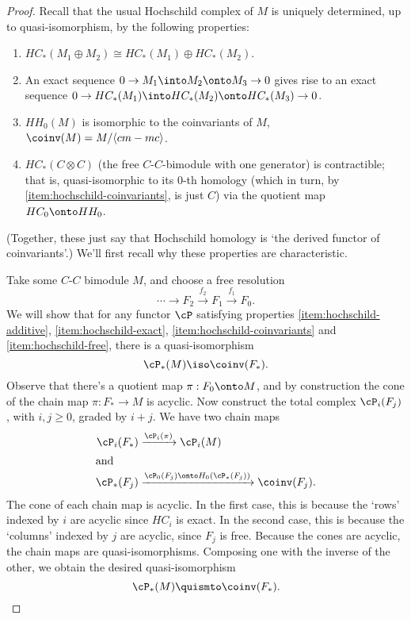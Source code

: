 \begin{proof}
Recall that the usual Hochschild complex of $M$ is uniquely determined,
up to quasi-isomorphism, by the following properties:
\begin{enumerate}
\item \label{item:hochschild-additive}%
$HC_*(M_1 \oplus M_2) \cong HC_*(M_1) \oplus HC_*(M_2)$.
\item \label{item:hochschild-exact}%
An exact sequence $0 \to M_1 \into M_2 \onto M_3 \to 0$ gives rise to an
exact sequence $0 \to HC_*(M_1) \into HC_*(M_2) \onto HC_*(M_3) \to 0$.
\item \label{item:hochschild-coinvariants}%
$HH_0(M)$ is isomorphic to the coinvariants of $M$, $\coinv(M) =
M/\langle cm-mc \rangle$.
\item \label{item:hochschild-free}%
$HC_*(C\otimes C)$ (the free $C$-$C$-bimodule with one generator) is contractible; that is,
quasi-isomorphic to its $0$-th homology (which in turn, by \ref{item:hochschild-coinvariants}, is just $C$) via the quotient map $HC_0 \onto HH_0$.
\end{enumerate}
(Together, these just say that Hochschild homology is `the derived functor of coinvariants'.)
We'll first recall why these properties are characteristic.

Take some $C$-$C$ bimodule $M$, and choose a free resolution
\begin{equation*}
\cdots \to F_2 \xrightarrow{f_2} F_1 \xrightarrow{f_1} F_0.
\end{equation*}
We will show that for any functor $\cP$ satisfying properties
\ref{item:hochschild-additive}, \ref{item:hochschild-exact},
\ref{item:hochschild-coinvariants} and \ref{item:hochschild-free}, there
is a quasi-isomorphism
$$\cP_*(M) \iso \coinv(F_*).$$
%
Observe that there's a quotient map $\pi: F_0 \onto M$, and by
construction the cone of the chain map $\pi: F_* \to M$ is acyclic. Now
construct the total complex $\cP_i(F_j)$, with $i,j \geq 0$, graded by
$i+j$. We have two chain maps
\begin{align*}
\cP_i(F_*) & \xrightarrow{\cP_i(\pi)} \cP_i(M) \\
\intertext{and}
\cP_*(F_j) & \xrightarrow{\cP_0(F_j) \onto H_0(\cP_*(F_j))} \coinv(F_j).
\end{align*}
The cone of each chain map is acyclic. In the first case, this is because the `rows' indexed by $i$ are acyclic since $HC_i$ is exact.
In the second case, this is because the `columns' indexed by $j$ are acyclic, since $F_j$ is free.
Because the cones are acyclic, the chain maps are quasi-isomorphisms. Composing one with the inverse of the other, we obtain the desired quasi-isomorphism
$$\cP_*(M) \quismto \coinv(F_*).$$


\end{proof}
